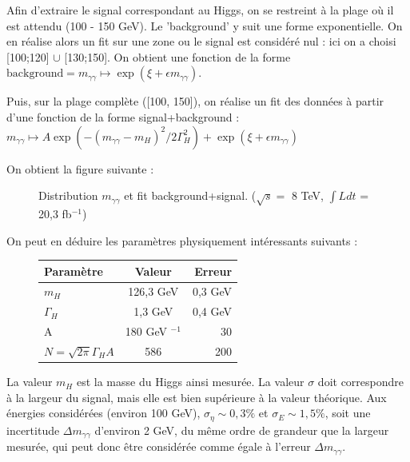 \documentclass[11pt]{article} %
\begin{document}
Afin d'extraire le signal correspondant au Higgs, on se restreint à la plage où il est attendu (100 - 150 GeV). Le 'background' y suit une forme exponentielle. On en réalise alors un fit sur une zone ou le signal est considéré nul : ici on a choisi [100;120] $\cup$  [130;150]. On obtient une fonction de la forme $\textrm{background} = m_{\gamma\gamma} \mapsto \exp(\xi + \epsilon m_{\gamma\gamma})$.

Puis, sur la plage complète ([100, 150]), on réalise un fit des données à partir d'une fonction de la forme signal+background : $m_{\gamma\gamma} \mapsto  A \exp\left(-(m_{\gamma\gamma}-m_H)^2/2\Gamma_H^2\right) + \exp(\xi + \epsilon m_{\gamma\gamma})$

On obtient la figure suivante :

\begin{figure}[H]
\centering
  \caption{Distribution $m_{\gamma \gamma}$ et fit background+signal. ($\sqrt{s} =$ 8 TeV,  $\int L dt$ = 20,3 fb$^{-1}$) }
 \resizebox{.8\linewidth}{!}{}
\end{figure}

On peut en déduire les paramètres physiquement intéressants suivants :

\begin{figure}[H]
\centering
\begin{tabular}{|l|c|r|} 
   \hline
   Paramètre & Valeur & Erreur \\
    \hline
   $m_H$ & 126,3 GeV & 0,3 GeV\\
  \hline
   $\Gamma_H$ & 1,3 GeV & 0,4 GeV \\
  \hline
A & 180 GeV ${}^{-1}$ & 30\\

 \hline
$N = \sqrt{2\pi} \Gamma_H A$ & 586 & 200\\
\hline
\end{tabular}
\end{figure}

La valeur $m_H$ est la masse du Higgs ainsi mesurée. La valeur $\sigma$ doit correspondre à la largeur du signal, mais elle est bien supérieure à la valeur théorique. Aux énergies considérées (environ 100 GeV), $\sigma_{\eta} \sim 0,3 \%$ \cite{resolution_position_photons} et $\sigma_{E} \sim 1,5 \%$, soit une incertitude $\Delta m_{\gamma\gamma}$ d'environ 2 GeV, du même ordre de grandeur que la largeur mesurée, qui peut donc être considérée comme égale à l'erreur $\Delta m_{\gamma\gamma}$.

\end{document}
